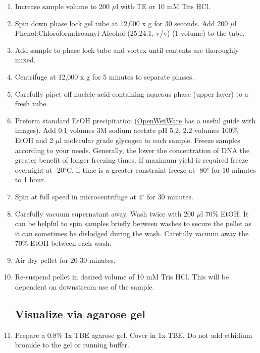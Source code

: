 \documentclass[12pt]{article}
\theoremstyle{definition}
\begin{document}
\begin{enumerate}
\item Increase sample volume to 200 $\mu$l with TE or 10 mM Tris HCl.

\item Spin down phase lock gel tube at 12,000 x g for 30 seconds. Add 200 $\mu$l Phenol:Chloroform:Isoamyl Alcohol (25:24:1, v/v) (1 volume) to the tube.

\item Add sample to phase lock tube and vortex until contents are thoroughly mixed. 

\item Centrifuge at 12,000 x g for 5 minutes to separate phases.

\item Carefully pipet off nucleic-acid-containing aqueous phase (upper layer) to a fresh tube.

\item Preform standard EtOH precipitation (\href{https://openwetware.org/wiki/Ethanol_precipitation_of_nucleic_acids}{OpenWetWare} has a useful guide with images). Add 0.1 volumes 3M sodium acetate pH 5.2, 2.2 volumes 100\% EtOH and 2 $\mu$l molecular grade glycogen to each sample. Freeze samples according to your needs. Generally, the lower the concentration of
DNA the greater benefit of longer freezing times. If maximum yield is required freeze overnight at -20$^{\circ}$C, if time is a
greater constraint freeze at -80$^{\circ}$ for 10 minutes to 1 hour.

\item Spin at full speed in microcentrifuge at 4$^{\circ}$ for 30 minutes. 

\item Carefully vacuum supernatant away. Wash twice with 200 $\mu$l 70\% EtOH. It can be helpful to spin samples briefly between washes to secure the pellet as it can sometimes be dislodged during the wash. Carefully vacuum away the 70\% EtOH
between each wash.

\item Air dry pellet for 20-30 minutes.

\item Re-suspend pellet in desired volume of 10 mM Tris HCl. This will be dependent on downstream use of the sample.

\subsection*{Visualize via agarose gel}

\item Prepare a 0.8\% 1x TBE agarose gel. Cover in 1x TBE. Do not add ethidium bromide to the gel or running buffer. 


\end{enumerate}
\end{document}
